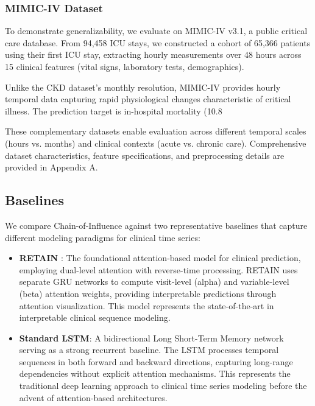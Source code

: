 \documentclass[letterpaper]{article}
\begin{document}
\begin{enumerate}
\subsubsection{MIMIC-IV Dataset}

To demonstrate generalizability, we evaluate on MIMIC-IV v3.1, a public critical care database. From 94,458 ICU stays, we constructed a cohort of 65,366 patients using their first ICU stay, extracting hourly measurements over 48 hours across 15 clinical features (vital signs, laboratory tests, demographics). 

Unlike the CKD dataset's monthly resolution, MIMIC-IV provides hourly temporal data capturing rapid physiological changes characteristic of critical illness. The prediction target is in-hospital mortality (10.8%

These complementary datasets enable evaluation across different temporal scales (hours vs. months) and clinical contexts (acute vs. chronic care). Comprehensive dataset characteristics, feature specifications, and preprocessing details are provided in Appendix A.

\subsection{Baselines}

We compare Chain-of-Influence against two representative baselines that capture different modeling paradigms for clinical time series:

\begin{itemize}
    \item \textbf{RETAIN} \cite{choi2016retain}: The foundational attention-based model for clinical prediction, employing dual-level attention with reverse-time processing. RETAIN uses separate GRU networks to compute visit-level (alpha) and variable-level (beta) attention weights, providing interpretable predictions through attention visualization. This model represents the state-of-the-art in interpretable clinical sequence modeling.
    
    \item \textbf{Standard LSTM}: A bidirectional Long Short-Term Memory network serving as a strong recurrent baseline. The LSTM processes temporal sequences in both forward and backward directions, capturing long-range dependencies without explicit attention mechanisms. This represents the traditional deep learning approach to clinical time series modeling before the advent of attention-based architectures.
\end{itemize}


\end{enumerate}
\end{document}
